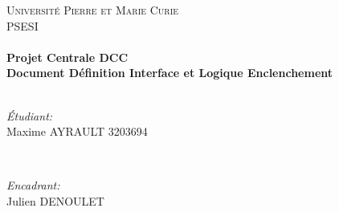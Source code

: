 \begin{titlepage}

\center %
 

\textsc{\LARGE Universit\'e Pierre et Marie Curie}\\[1.5cm] %
\textsc{\Large PSESI}\\[0.5cm] %


\HRule \\[0.4cm]
{ \huge \bfseries Projet Centrale DCC}\\[0.4cm] %
{ \huge \bfseries Document Définition Interface et Logique Enclenchement}\\[0.4cm] %
\HRule \\[1.5cm]
 

\begin{minipage}{0.4\textwidth}
\begin{flushleft} \large
\emph{\'Etudiant:}\\
Maxime \textsc{AYRAULT} 3203694 %
\end{flushleft}
\end{minipage}
~
\begin{minipage}{0.4\textwidth}
\begin{flushright} \large
\emph{Encadrant:} \\
Julien \textsc{DENOULET} %
\end{flushright}
\end{minipage}\\[2cm]



\end{titlepage}
